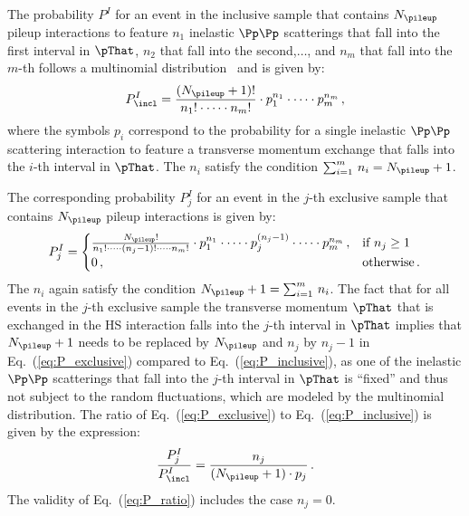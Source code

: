 The probability $P^{I}$ for an event in the inclusive sample that contains $N_{\pileup}$ pileup interactions
to feature $n_{1}$ inelastic $\Pp\Pp$ scatterings that fall into the first interval in $\pThat$, $n_{2}$ that fall into the second,$\dots$, and $n_{m}$ that fall into the $m$-th 
follows a multinomial distribution~\cite{evans2011statistical} and is given by:
\begin{equation}
P_{\incl}^{I} = \frac{(N_{\pileup} + 1)!}{n_{1}! \cdot \dots \cdot n_{m}!} \cdot p_{1}^{n_{1}} \cdot \dots \cdot p_{m}^{n_{m}} \, ,
\label{eq:P_inclusive}
\end{equation}
where the symbols $p_{i}$ correspond to the probability for a single inelastic $\Pp\Pp$ scattering interaction to feature a transverse momentum exchange that falls into the $i$-th interval in $\pThat$.
The $n_{i}$ satisfy the condition $\sum_{i=1}^{m} \, n_{i} = N_{\pileup} + 1$.

The corresponding probability $P_{j}^{I}$ for an event in the $j$-th exclusive sample that contains $N_{\pileup}$ pileup interactions is given by:
\begin{equation}
P_{j}^{I} = \begin{cases}
\frac{N_{\pileup}!}{n_{1}! \cdot \dots \cdot (n_{j} - 1)! \cdot \dots \cdot n_{m}!} \cdot p_{1}^{n_{1}} \cdot \dots \cdot p_{j}^{(n_{j} - 1)} \cdot \dots \cdot p_{m}^{n_{m}} \, ,
  & \text{if $n_{j} \geq 1$} \\
0 \, , & \text{otherwise} \, .
\end{cases}
\label{eq:P_exclusive}
\end{equation}
The $n_{i}$ again satisfy the condition $N_{\pileup} + 1 = \sum_{i=1}^{m} \, n_{i}$.
The fact that for all events in the $j$-th exclusive sample the transverse momentum $\pThat$ that is exchanged in the HS interaction falls into the $j$-th interval in $\pThat$
implies that $N_{\pileup} + 1$ needs to be replaced by $N_{\pileup}$ and $n_{j}$ by $n_{j} - 1$ in Eq.~(\ref{eq:P_exclusive}) compared to Eq.~(\ref{eq:P_inclusive}),
as one of the inelastic $\Pp\Pp$ scatterings that fall into the $j$-th interval in $\pThat$ is ``fixed'' and thus not subject to the random fluctuations, which are modeled by the multinomial distribution.
The ratio of Eq.~(\ref{eq:P_exclusive}) to Eq.~(\ref{eq:P_inclusive}) is given by the expression:
\begin{equation}
\frac{P_{j}^{I}}{P_{\incl}^{I}} = \frac{n_{j}}{(N_{\pileup} + 1) \cdot p_{j}} \, .
\label{eq:P_ratio}
\end{equation}
The validity of Eq.~(\ref{eq:P_ratio}) includes the case $n_{j} = 0$.

